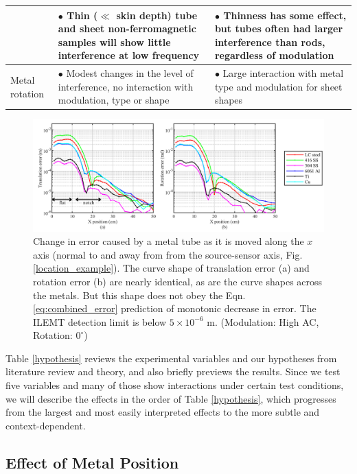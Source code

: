 \documentclass[journal,twoside,web]{ieeecolor}
\begin{document}
\begin{table}[!htbp]
\begin{tabular}{|p{90pt}|p{200pt}|p{200pt}|}
$ $& 
$\bullet$ Thin ($\ll$ skin depth) tube and sheet non-ferromagnetic samples will show little interference at low frequency& 
$\bullet$ Thinness has some effect, but tubes often had larger interference than rods, regardless of modulation\\

\hline
Metal rotation& 
$\bullet$ Modest changes in the level of interference, no interaction with modulation, type or shape& 
$\bullet$ Large interaction with metal type and modulation for sheet shapes\\

\hline
\end{tabular}
\end{table}

\begin{figure}[!b]
\centerline{\includegraphics[width=\textwidth]{chaic6.png}}
\caption{Change in error caused by a metal tube as it is moved along the $x$ axis (normal to and away from from the source-sensor axis, Fig. \ref{location_example}). The curve shape of translation error (a) and rotation error (b) are nearly identical, as are the curve shapes across the metals. But this shape does not obey the Eqn. \eqref{eq:combined_error} prediction of monotonic decrease in error. The ILEMT detection limit is below $5 \times 10^{-6}$ m. (Modulation: High AC, Rotation: $0^\circ$)}
\label{hollow_high_xmoving}
\end{figure}

Table \ref{hypothesis} reviews the experimental variables and our hypotheses from literature review and theory, and also briefly previews the results. Since we test five variables and many of those show interactions under certain test conditions, we will describe the effects in the order of Table \ref{hypothesis}, which progresses from the largest and most easily interpreted effects to the more subtle and context-dependent. 

\subsection{Effect of Metal Position}
\end{document}
